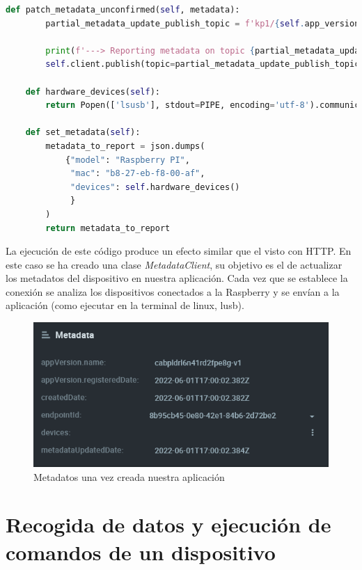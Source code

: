 {\begin{lstlisting}[language=Python]
    def patch_metadata_unconfirmed(self, metadata):
        partial_metadata_update_publish_topic = f'kp1/{self.app_version}/epmx/{self.endpoint_token}/update/keys'

        print(f'---> Reporting metadata on topic {partial_metadata_update_publish_topic}\nwith payload {metadata}')
        self.client.publish(topic=partial_metadata_update_publish_topic, payload=metadata)

    def hardware_devices(self):
        return Popen(['lsusb'], stdout=PIPE, encoding='utf-8').communicate()[0]

    def set_metadata(self):
        metadata_to_report = json.dumps(
            {"model": "Raspberry PI",
             "mac": "b8-27-eb-f8-00-af",
             "devices": self.hardware_devices()
             }
        )
        return metadata_to_report

\end{lstlisting}

La ejecución de este código produce un efecto similar que el visto con HTTP. En este caso se ha creado una clase \textit{MetadataClient}, su objetivo es el de actualizar los metadatos del dispositivo en nuestra aplicación. Cada vez que se establece la conexión se analiza los dispositivos conectados a la Raspberry y se envían a la aplicación (como ejecutar en la terminal de linux, lusb).


\begin{figure}[p]
    \centering
    \includegraphics[width=\linewidth]{imagenes/metadata-old.png}
    \caption{Metadatos una vez creada nuestra aplicación}
    \label{fig:figure11}
\end{figure}


\section{Recogida de datos y ejecución de comandos de un dispositivo}


}
